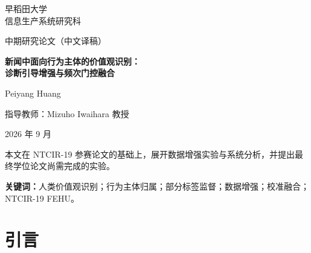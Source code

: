 \documentclass[12pt,a4paper]{article}
\begin{document}
\hypersetup{pageanchor=false}
\begin{titlepage}
\centering
\vspace*{22mm}
{\large 早稻田大学\\信息生产系统研究科\par}
\vspace{23mm}
{\Large 中期研究论文（中文译稿）\par}
\vspace{14mm}
{\LARGE\bfseries 新闻中面向行为主体的价值观识别：\\诊断引导增强与频次门控融合\par}
\vspace{22mm}
{\large Peiyang Huang\par}
\vspace{6mm}
{\large 指导教师：Mizuho Iwaihara 教授\par}
\vfill
{\large 2026 年 9 月\par}
\vspace{10mm}
\begin{minipage}{0.88\textwidth}\small
本文在 NTCIR-19 参赛论文的基础上，展开数据增强实验与系统分析，并提出最终学位论文尚需完成的实验。
\end{minipage}
\end{titlepage}
\hypersetup{pageanchor=true}
\begin{abstract}
新闻报道往往通过行动及其后果隐含地呈现人类价值观。识别这些价值观，有助于分析新闻如何通过行为描述刻画个人和机构。这类分析需要结合行为主体与事件语境，因为同一篇报道可能涉及角色和利益不同的多个主体。NTCIR-19 FEHU（基于事实、以事件为中心的人类价值观理解）旨在评估系统能否从事实性新闻中识别与特定行为主体相关的价值观，并判断报道中的行为与这些价值观一致还是相悖。本文仅研究 Task~1，即针对给定的行为主体集合进行文章级价值观识别。

本研究关注低频标签的监督不足，以及扩大预测覆盖时出现的误报和方向错误。DRA-FEHU 根据错误诊断生成补充训练样本，并比较完整标签监督与部分标签监督。在推理阶段，WAIPS-02 结合不同提示的多数投票与独立的方向仲裁。WAIPS-03 对文章进行分段以形成初始预测，再通过频次门控融合，利用辅助提示预测和编码器分数调整标签集合，并对方向判断存在分歧的预测进行选择性检查。
\end{abstract}
\vspace{8pt}
\noindent\textbf{关键词：}人类价值观识别；行为主体归属；部分标签监督；数据增强；校准融合；NTCIR-19 FEHU。
\tableofcontents
\clearpage
{}

\section{引言}
\end{document}
